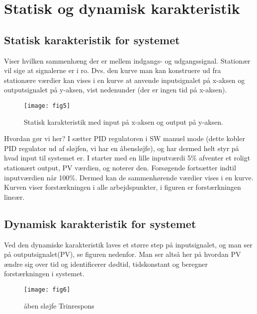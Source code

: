 \documentclass[12pt,a4paper]{article}
\begin{document}
	\clearpage
	
	\section{Statisk og dynamisk karakteristik}
	\label{sec:statiskDynamiskKarakteristik}
	\subsection*{Statisk karakteristik for systemet}
	Viser hvilken sammenhæng der er mellem indgangs- og udgangssignal. Stationær vil sige at signalerne er i ro. Dvs. den kurve man kan konstruere ud fra stationære værdier kan vises i en kurve at anvende inputsignalet på x-aksen og outputsignalet på y-aksen, vist nedenunder (der er ingen tid på x-aksen).
	
	\begin{figure}[ht]
		\centering
		\texttt{[image: fig5]}
		\caption{Statisk karakteristik med input på x-aksen og output på y-aksen.}
		\label{fig:static_char}
	\end{figure}
	\noindent Hvordan gør vi her? I sætter PID regulatoren i SW manuel mode (dette kobler PID regulator ud af sløjfen, vi har en åbensløjfe), og har dermed helt styr på hvad input til systemet er. I starter med en lille inputværdi 5\% afventer et roligt stationært output, PV værdien, og noterer den. Forsøgende fortsætter indtil inputværdien når 100\%. Dermed kan de sammenhørende værdier vises i en kurve. Kurven viser forstærkningen i alle arbejdspunkter, i figuren er forstærkningen lineær.
	
	\subsection*{Dynamisk karakteristik for systemet}
	Ved den dynamiske karakteristik laves et større step på inputsignalet, og man ser på outputsignalet(PV), se figuren nedenfor. Man ser altså her på hvordan PV ændre sig over tid og identificerer dødtid, tidskonstant og beregner forstærkningen i systemet.
	\begin{figure}[ht]
		\centering
		\texttt{[image: fig6]}
		\caption{åben sløjfe Trinrespons}
		\label{fig:trinrespons}
	\end{figure}
	
\end{document}
